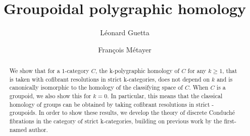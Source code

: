 \documentclass[reqno]{amsart}
\title{Groupoidal polygraphic homology}
\author{Léonard Guetta}
\author{Fran\c{c}ois M\'etayer}
\begin{document}
\begin{abstract} 
We show that for a $1$-category $C$, the \ook k-polygraphic homology
of $C$ for any $k\geq 1$, that is taken with cofibrant resolutions in strict \ook
k-categories, does not depend on $k$ and is canonically isomorphic to
the homology of the classifying space of $C$. When $C$ is a groupoid,
we also show this for $k=0$. In particular, this means that the
classical homology of groups can be obtained by taking cofibrant
resolutions in strict \oo-groupoids.
In order to show these results, we develop the theory of discrete
Conduché fibrations in the category of strict \ook k-categories,
building on previous work by the first-named author.
\end{abstract}

\maketitle




\end{document}

